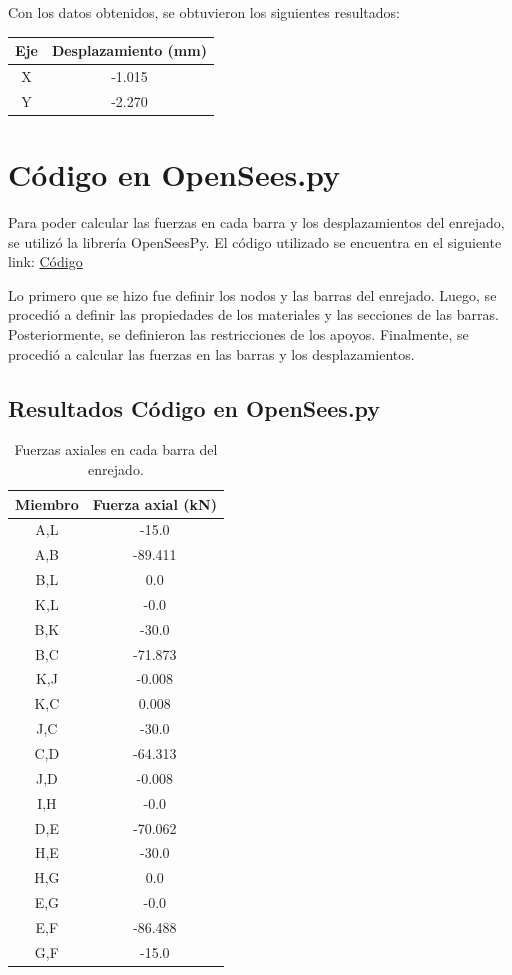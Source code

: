 \documentclass{article}  %
\begin{document}
Con los datos obtenidos, se obtuvieron los siguientes resultados:

\begin{table}[h]
  \centering
  
  \begin{tabular}{cc}
    \hline
    \textbf{Eje} & \textbf{Desplazamiento (mm)} \\
    \hline
    X & -1.015 \\
    Y & -2.270 \\
    \hline
  \end{tabular}
\end{table}

\newpage
\section{Código en OpenSees.py}
Para poder calcular las fuerzas en cada barra y los desplazamientos del enrejado, se utilizó la librería OpenSeesPy. El código utilizado se encuentra en el siguiente link: \href{https://github.com/berckanala/P2E0_MCOC/tree/main/c%C3%B3digo}{Código}

Lo primero que se hizo fue definir los nodos y las barras del enrejado. Luego, se procedió a definir las propiedades de los materiales y las secciones de las barras. Posteriormente, se definieron las restricciones de los apoyos. Finalmente, se procedió a calcular las fuerzas en las barras y los desplazamientos.

\subsection{Resultados Código en OpenSees.py}
\begin{table}[h!]
  \centering
  \begin{tabular}{cc}
  \hline
  \textbf{Miembro} & \textbf{Fuerza axial (kN)} \\
  \hline
  A,L & -15.0   \\
  A,B & -89.411 \\
  B,L & 0.0     \\
  K,L & -0.0    \\
  B,K & -30.0   \\
  B,C & -71.873 \\
  K,J & -0.008  \\
  K,C & 0.008   \\
  J,C & -30.0   \\
  C,D & -64.313 \\
  J,D & -0.008  \\
  I,H & -0.0    \\
  D,E & -70.062 \\
  H,E & -30.0   \\
  H,G & 0.0     \\
  E,G & -0.0    \\
  E,F & -86.488 \\
  G,F & -15.0   \\
  \hline
  \end{tabular}
  \caption{Fuerzas axiales en cada barra del enrejado.}
  \label{tab:2}
\end{table}
\end{document}
